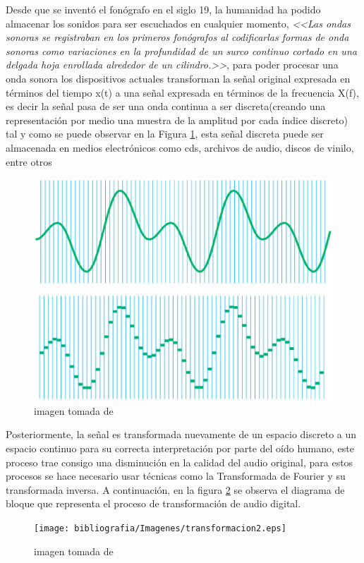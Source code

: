 Desde que se inventó el fonógrafo en el siglo 19, la humanidad ha podido almacenar los sonidos para ser escuchados en cualquier momento, \textit{<<Las ondas sonoras se registraban en los primeros fonógrafos al codificarlas formas de onda sonoras como variaciones en la profundidad de un surco continuo cortado en una delgada hoja enrollada alrededor de un cilindro.>>}\cite{fisica_serway}, para poder procesar una onda sonora los dispositivos actuales transforman la señal original expresada en términos del tiempo x(t) a una señal expresada en términos de la frecuencia X(f), es decir la señal pasa de ser una onda continua a ser discreta(creando una representación por medio una muestra de la amplitud por cada índice discreto\cite{audioCoding}) tal y como se puede observar en la Figura \ref{sonido_continuo_disctreto}, esta señal discreta puede ser almacenada en medios electrónicos como cds, archivos de audio, discos de vinilo, entre otros 

\begin{figure}[H]
\centering
\includegraphics[width=0.7\linewidth]{bibliografia/Imagenes/transformacion.eps}
\caption{ imagen tomada de  \cite{fisica_serway}}
\label{sonido_continuo_disctreto}
\end{figure}

Posteriormente, la señal es transformada nuevamente de un espacio discreto a un espacio continuo para su correcta interpretación por parte del oído humano, este proceso trae consigo una disminución en la calidad del audio original, para estos procesos se hace necesario usar técnicas como la Transformada de Fourier y su transformada inversa. A continuación, en la figura \ref{sonido_digital} se observa el diagrama de bloque que representa el proceso de transformación de audio digital.
 
\begin{figure}[H]
    \centering
    \texttt{[image: bibliografia/Imagenes/transformacion2.eps]}
    \caption{imagen tomada de \cite{audioCoding}}
    \label{sonido_digital}
\end{figure}
 
